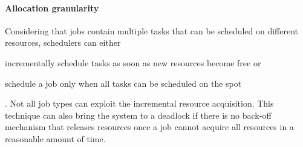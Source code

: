 \paragraph{Allocation granularity}
Considering that jobs contain multiple tasks that can be scheduled on different resources, schedulers can either
\begin{mylist}
    \item incrementally schedule tasks as soon as new resources become free or
    \item schedule a job only when all tasks can be scheduled on the spot
\end{mylist}.
Not all job types can exploit the incremental resource acquisition.
This technique can also bring the system to a deadlock if there is no back-off mechanism that releases resources once a job cannot acquire all resources in a reasonable amount of time.